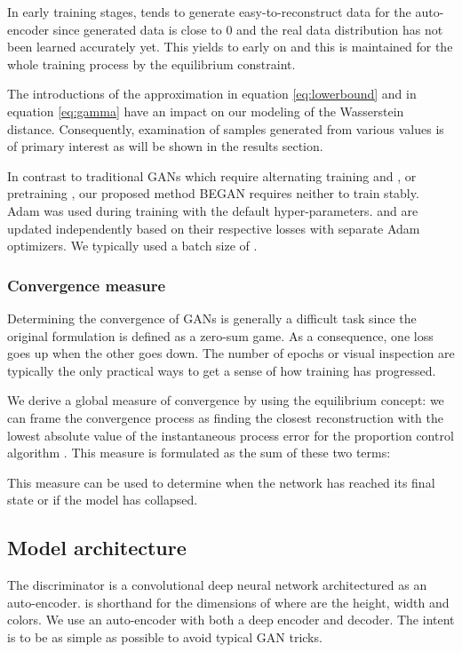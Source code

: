 \documentclass[english]{article}
\begin{document}
In early training stages,  tends to generate easy-to-reconstruct
data for the auto-encoder since generated data is close to 0 and the
real data distribution has not been learned accurately yet. This yields
to  early on and this is maintained
for the whole training process by the equilibrium constraint. 

The introductions of the approximation in equation \ref{eq:lowerbound}
and  in equation \ref{eq:gamma} have an impact on our modeling
of the Wasserstein distance. Consequently, examination of samples
generated from various  values is of primary interest as
will be shown in the results section. 

In contrast to traditional GANs which require alternating training
 and , or pretraining , our proposed method BEGAN requires
neither to train stably. Adam \cite{kingma2014adam} was used during
training with the default hyper-parameters.  and 
are updated independently based on their respective losses with separate
Adam optimizers. We typically used a batch size of . 


\subsubsection{Convergence measure}

Determining the convergence of GANs is generally a difficult task
since the original formulation is defined as a zero-sum game. As a
consequence, one loss goes up when the other goes down. The number
of epochs or visual inspection are typically the only practical ways
to get a sense of how training has progressed.

We derive a global measure of convergence by using the equilibrium
concept: we can frame the convergence process as finding the closest
reconstruction  with the lowest absolute value of
the instantaneous process error for the proportion control algorithm
. This measure is formulated
as the sum of these two terms:




This measure can be used to determine when the network has reached
its final state or if the model has collapsed.


\subsection{Model architecture}

The discriminator 
is a convolutional deep neural network architectured as an auto-encoder.
 is shorthand for the dimensions of 
where  are the height, width and colors. We use an auto-encoder
with both a deep encoder and decoder. The intent is to be as simple
as possible to avoid typical GAN tricks. 
\end{document}

